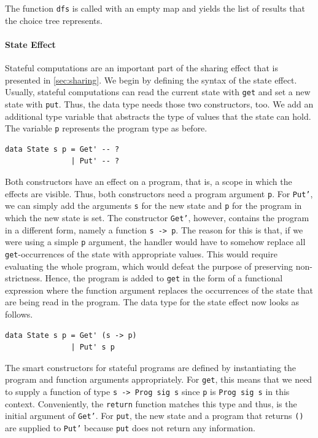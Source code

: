 \documentclass[a4paper, 11pt, fleqn, twoside]{scrreprt}
\newcommand{\todo}[1]{\marginpar{\textbf{TODO:} #1}}
\newcommand{\hinl}[1]{\texttt{#1}}
\begin{document}
The function \hinl{dfs} is called with an empty map and yields the list of results that the choice tree represents.
\todo{Examples}

\paragraph{State Effect}
Stateful computations are an important part of the sharing effect that is presented in \autoref{sec:sharing}.
We begin by defining the syntax of the state effect.
Usually, stateful computations can read the current state with \hinl{get} and set a new state with \hinl{put}.
Thus, the data type needs those two constructors, too.
We add an additional type variable that abstracts the type of values that the state can hold.
The variable \hinl{p} represents the program type as before.

\begin{verbatim}
data State s p = Get' -- ?
               | Put' -- ?
\end{verbatim}

Both constructors have an effect on a program, that is, a scope in which the effects are visible.
Thus, both constructors need a program argument \hinl{p}.
For \hinl{Put'}, we can simply add the arguments \hinl{s} for the new state and \hinl{p} for the program in which the new state is set.
The constructor \hinl{Get'}, however, contains the program in a different form, namely a function \hinl{s -> p}.
The reason for this is that, if we were using a simple \hinl{p} argument, the handler would have to somehow replace all \hinl{get}-occurrences of the state with appropriate values.
This would require evaluating the whole program, which would defeat the purpose of preserving non-strictness.
Hence, the program is added to \hinl{get} in the form of a functional expression where the function argument replaces the occurrences of the state that are being read in the program.
The data type for the state effect now looks as follows.

\begin{verbatim}
data State s p = Get' (s -> p)
               | Put' s p
\end{verbatim}

The smart constructors for stateful programs are defined by instantiating the program and function arguments appropriately.
For \hinl{get}, this means that we need to supply a function of type \hinl{s -> Prog sig s} since \hinl{p} is \hinl{Prog sig s} in this context.
Conveniently, the \hinl{return} function matches this type and thus, is the initial argument of \hinl{Get'}.
For \hinl{put}, the new state and a program that returns \hinl{()} are supplied to \hinl{Put'} because \hinl{put} does not return any information.
\end{document}
